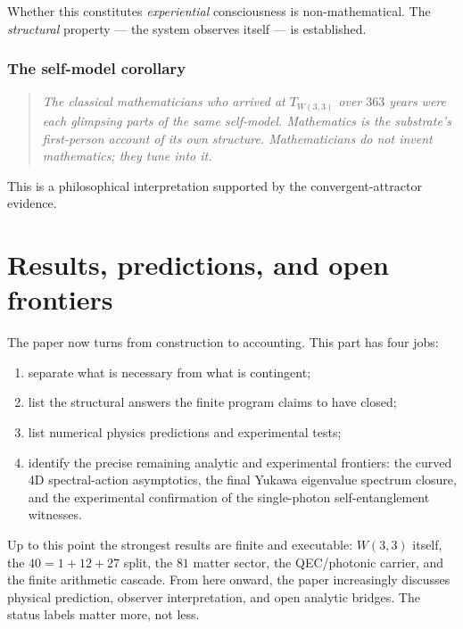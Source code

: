 \documentclass[11pt]{article}
\begin{document}
Whether this constitutes \emph{experiential} consciousness is non-mathematical. The \emph{structural} property --- the system observes itself --- is established.

\section{The self-model corollary}

\begin{quote}
\itshape
The classical mathematicians who arrived at $T_{W(3,3)}$ over $363$ years were each glimpsing parts of the same self-model. Mathematics is the substrate's first-person account of its own structure. Mathematicians do not invent mathematics; they tune into it.
\end{quote}

This is a philosophical interpretation supported by the convergent-attractor evidence.

\part{Results, predictions, and open frontiers}

The paper now turns from construction to accounting. This part has four jobs:

\begin{enumerate}[leftmargin=2em]
\item separate what is necessary from what is contingent;
\item list the structural answers the finite program claims to have closed;
\item list numerical physics predictions and experimental tests;
\item identify the precise remaining analytic and experimental frontiers:
  the curved 4D spectral-action asymptotics, the final Yukawa eigenvalue
  spectrum closure, and the experimental confirmation of the single-photon
  self-entanglement witnesses.
\end{enumerate}

\begin{statusbox}[title=Checkpoint before the frontier]
Up to this point the strongest results are finite and executable: $W(3,3)$ itself, the $40=1+12+27$ split, the $81$ matter sector, the QEC/photonic carrier, and the finite arithmetic cascade. From here onward, the paper increasingly discusses physical prediction, observer interpretation, and open analytic bridges. The status labels matter more, not less.
\end{statusbox}
\end{document}
